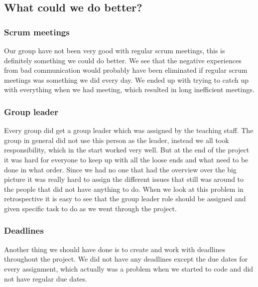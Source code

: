 \documentclass[a4paper, 10pt]{article}
\begin{document}
\subsection{What could we do better?}
\subsubsection{Scrum meetings}
Our group have not been very good with regular scrum meetings, this is definitely something we could do better. We see that the negative experiences from bad communication would probably have been eliminated if regular scrum meetings was something we did every day. We ended up with trying to catch up with everything when we had meeting, which resulted in long inefficient meetings. 
\subsubsection{Group leader}
Every group did get a group leader which was assigned by the teaching staff. The group in general did not use this person as the leader, instead we all took responsibility, which in the start worked very well. But at the end of the project it was hard for everyone to keep up with all the loose ends and what need to be done in what order.  Since we had no one that had the overview over the big picture it was really hard to assign the different issues that still was around to the people that did not have anything to do. When we look at this problem in retrospective it is easy to see that the group leader role should be assigned and given specific task to do as we went through the project.

\subsubsection{Deadlines}
Another thing we should have done is to create and work with deadlines throughout the project. We did not have any deadlines except the due dates for every assignment, which actually was a problem when we started to code and did not have regular due dates.
\end{document}
